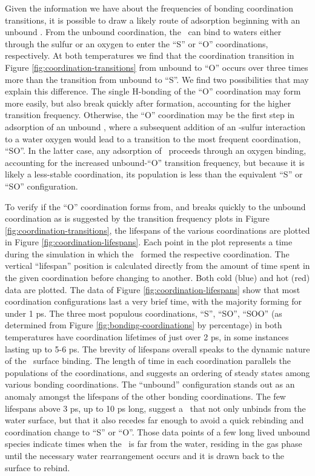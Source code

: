 \documentclass{article}
\begin{document}
Given the information we have about the frequencies of bonding coordination transitions, it is possible to draw a likely route of adsorption beginning with an unbound \suldiox. From the unbound coordination, the \suldiox~can bind to waters either through the sulfur or an oxygen to enter the ``S'' or ``O'' coordinations, respectively. At both temperatures we find that the coordination transition in Figure \ref{fig:coordination-transitions} from unbound to ``O'' occurs over three times more than the transition from unbound to ``S''. We find two possibilities that may explain this difference. The single H-bonding of the ``O'' coordination may form more easily, but also break quickly after formation, accounting for the higher transition frequency. Otherwise, the ``O'' coordination may be the first step in adsorption of an unbound \suldiox, where a subsequent addition of an \suldiox-sulfur interaction to a water oxygen would lead to a transition to the most frequent coordination, ``SO''. In the latter case, any adsorption of \suldiox~proceeds through an oxygen binding, accounting for the increased unbound-``O'' transition frequency, but because it is likely a less-stable coordination, its population is less than the equivalent ``S'' or ``SO'' configuration.

To verify if the ``O'' coordination forms from, and breaks quickly to the unbound coordination as is suggested by the transition frequency plots in Figure \ref{fig:coordination-transitions}, the lifespans of the various coordinations are plotted in Figure \ref{fig:coordination-lifespans}. Each point in the plot represents a time during the simulation in which the \suldiox~formed the respective coordination. The vertical ``lifespan'' position is calculated directly from the amount of time spent in the given coordination before changing to another. Both cold (blue) and hot (red) data are plotted. The data of Figure \ref{fig:coordination-lifespans} show that most coordination configurations last a very brief time, with the majority forming for under 1 ps. The three most populous coordinations, ``S'', ``SO'', ``SOO'' (as determined from Figure \ref{fig:bonding-coordinations} by percentage) in both temperatures have coordination lifetimes of just over 2 ps, in some instances lasting up to 5-6 ps. The brevity of lifespans overall speaks to the dynamic nature of the \suldiox~surface binding. The length of time in each coordination parallels the populations of the coordinations, and suggests an ordering of steady states among various bonding coordinations. The ``unbound'' configuration stands out as an anomaly amongst the lifespans of the other bonding coordinations. The few lifespans above 3 ps, up to 10 ps long, suggest a \suldiox~that not only unbinds from the water surface, but that it also recedes far enough to avoid a quick rebinding and coordination change to ``S'' or ``O''. Those data points of a few long lived unbound species indicate times when the \suldiox~is far from the water, residing in the gas phase until the necessary water rearrangement occurs and it is drawn back to the surface to rebind.
\end{document}
